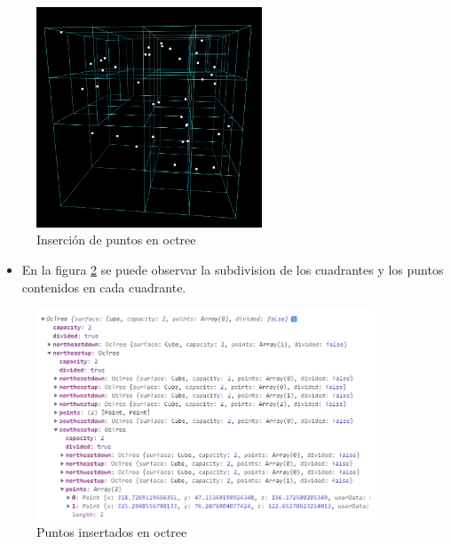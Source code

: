 \documentclass{article}
\begin{document}
\begin{figure}[h!]
	\centering
	\includegraphics[width=0.6\textwidth]{img/octree_insert.png}
	\caption{Inserción de puntos en octree}
	\label{fig:octree_insert}
\end{figure}
\clearpage
\begin{itemize}
	\item En la figura \ref{fig:octree_insert_data} se puede observar la subdivision de los cuadrantes y los puntos contenidos en cada cuadrante.
\end{itemize}

\begin{figure}[h!]
	\centering
	\includegraphics[width=0.9\textwidth]{img/octree_insert_data.png}
	\caption{Puntos insertados en octree}
	\label{fig:octree_insert_data}
\end{figure}
\end{document}
